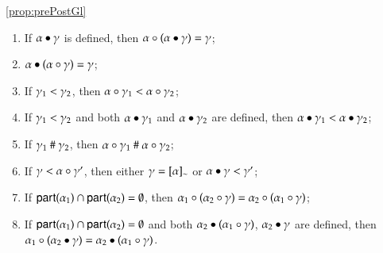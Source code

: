\begin{lemmaa}{\ref{prop:prePostGl}}{\begin{enumerate}
\item  If $\postG{\comocc}{\alpha}$ is defined, then $\preG{(\postG{\comocc}{\alpha})}{\alpha}=\comocc$;
\item 
$\postG{(\preG{\comocc}{\alpha})}{\alpha}=\comocc$;
 \item   If  $\comocc_1< \comocc_2$, 
then $\preG{\comocc_1}{\alpha}< \preG{\comocc_2}{\alpha}$;
\item  If  $\comocc_1<\comocc_2$ and  both $\postG{\comocc_1}{\alpha}$ and
  $\postG{\comocc_2}{\alpha}$ %
  are 
  defined, then
  $\postG{\comocc_1}{\alpha}< \postG{\comocc_2}{\alpha}$;
 \item   If $\comocc_1\gr \comocc_2$, 
then $\preG{\comocc_1}{\alpha}\gr \preG{\comocc_2}{\alpha}$;
  \item  If $\comocc<\preG{\comocc'}{\alpha}$, then either $\comocc=\eqclass\alpha$ or $\postG{\comocc}{\alpha}<{\comocc'}$;
 \item  If $\participant{\alpha_1}\cap\participant{\alpha_2}=\emptyset$, then $\preG{(\preG{\comocc}{\alpha_2})}{\alpha_1}=\preG{(\preG{\comocc}{\alpha_1})}{\alpha_2}$;
 \item  If $\participant{\alpha_1}\cap\participant{\alpha_2}=\emptyset$ and both $\postG{(\preG{\comocc}{\alpha_1})}{\alpha_2}$, $\postG{\comocc}{\alpha_2}$ are defined, then $\preG{(\postG{\comocc}{\alpha_2})}{\alpha_1}= \postG{(\preG{\comocc}{\alpha_1})}{\alpha_2}$.
\end{enumerate}}\end{lemmaa}
